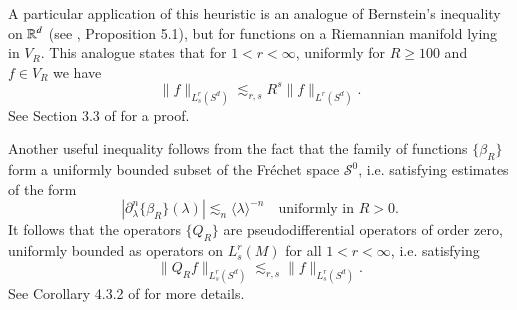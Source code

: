 \begin{remarks}
\begin{enumerate}
    A particular application of this heuristic is an analogue of Bernstein's inequality on $\operatorname{\mathbb{R}}^d$ (see \cite{Wolff},  Proposition 5.1), but for functions on a Riemannian manifold lying in $V_R$. This analogue states that for $1 < r < \infty$, uniformly for $R \geq 100$ and $f \in V_R$ we have
    \begin{equation} \label{ManifoldBernsteinInequality}
        \| f \|_{L^r_s(S^d)} \lesssim_{r,s} R^s \| f \|_{L^r(S^d)}.
    \end{equation}
    See Section 3.3 of \cite{Sogge} for a proof.

    Another useful inequality follows from the fact that the family of functions $\{ \beta_R \}$ form a uniformly bounded subset of the Fr\'{e}chet space $\mathcal{S}^0$, i.e. satisfying estimates of the form
    \[ |\partial_\lambda^n \{ \beta_R \}(\lambda)| \lesssim_n \langle \lambda \rangle^{-n} \quad\text{uniformly in $R > 0$}. \]
    It follows that the operators $\{ Q_R \}$ are pseudodifferential operators of order zero, uniformly bounded as operators on $L^r_s(M)$ for all $1 < r < \infty$, i.e. satisfying
    \begin{equation}
        \| Q_R f \|_{L^r_s(S^d)} \lesssim_{r,s} \| f \|_{L^r_s(S^d)}.
    \end{equation}
    See Corollary 4.3.2 of \cite{Sogge} for more details.
\end{enumerate}
\end{remarks}

\begin{comment}

Our remarks reduce Theorem \ref{MainSphereTheorem} to the following statement.

\begin{theorem} \label{RestrictedMainSphereTheorem}
    Suppose $1 \leq p < 2d/(d+1)$. If $R \geq 100$, then for $f \in V_R$,
    \[ \| M_R f \|_{L^p(S^d)} \lesssim C_p(h) \| f \|_{L^p(S^d)}, \]
    where the implicit constant is uniform in $f$, $h$, and $R$.
\end{theorem}

\begin{proof}[Proof that Theorem \ref{RestrictedMainSphereTheorem} implies Theorem \ref{MainSphereTheorem}]
    Remark 2 shows that the analysis of $\{ M_R \}$ for $R \leq 100$ is trivial. For any $f \in L^p(S^d)$, $Q_R f \in V_R$, we conclude from Remark 3 that
    \[ \| M_R f \|_{L^p(S^d)} = \| M_R (Q_R f) \|_{L^p(S^d)} \lesssim C_p(h) \| Q_R f \|_{L^p(S^d)} \lesssim C_p(h) \| f \|_{L^p(S^d)}. \]
    We have thus obtained the required bound for general inputs.
\end{proof}

\end{comment}

